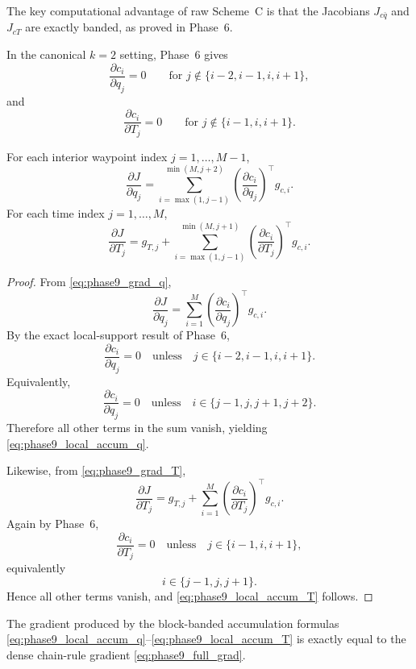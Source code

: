 The key computational advantage of raw Scheme~C is that the Jacobians \(J_{c\bar q}\) and \(J_{cT}\) are exactly banded, as proved in Phase~6.

In the canonical \(k=2\) setting, Phase~6 gives
\[
\frac{\partial c_i}{\partial q_j}=0
\qquad\text{for } j\notin\{i-2,i-1,i,i+1\},
\]
and
\[
\frac{\partial c_i}{\partial T_j}=0
\qquad\text{for } j\notin\{i-1,i,i+1\}.
\]

\begin{proposition}
\label{prop:phase9_local_accumulation}
For each interior waypoint index \(j=1,\dots,M-1\),
\begin{equation}
\label{eq:phase9_local_accum_q}
\frac{\partial J}{\partial q_j}
=
\sum_{i=\max(1,j-1)}^{\min(M,j+2)}
\left(\frac{\partial c_i}{\partial q_j}\right)^\top g_{c,i}.
\end{equation}
For each time index \(j=1,\dots,M\),
\begin{equation}
\label{eq:phase9_local_accum_T}
\frac{\partial J}{\partial T_j}
=
g_{T,j}
+
\sum_{i=\max(1,j-1)}^{\min(M,j+1)}
\left(\frac{\partial c_i}{\partial T_j}\right)^\top g_{c,i}.
\end{equation}
\end{proposition}

\begin{proof}
From \eqref{eq:phase9_grad_q},
\[
\frac{\partial J}{\partial q_j}
=
\sum_{i=1}^{M}
\left(\frac{\partial c_i}{\partial q_j}\right)^\top g_{c,i}.
\]
By the exact local-support result of Phase~6,
\[
\frac{\partial c_i}{\partial q_j}=0
\quad\text{unless}\quad
j\in\{i-2,i-1,i,i+1\}.
\]
Equivalently,
\[
\frac{\partial c_i}{\partial q_j}=0
\quad\text{unless}\quad
i\in\{j-1,j,j+1,j+2\}.
\]
Therefore all other terms in the sum vanish, yielding \eqref{eq:phase9_local_accum_q}.

Likewise, from \eqref{eq:phase9_grad_T},
\[
\frac{\partial J}{\partial T_j}
=
g_{T,j}
+
\sum_{i=1}^{M}
\left(\frac{\partial c_i}{\partial T_j}\right)^\top g_{c,i}.
\]
Again by Phase~6,
\[
\frac{\partial c_i}{\partial T_j}=0
\quad\text{unless}\quad
j\in\{i-1,i,i+1\},
\]
equivalently
\[
i\in\{j-1,j,j+1\}.
\]
Hence all other terms vanish, and \eqref{eq:phase9_local_accum_T} follows.
\end{proof}

\begin{corollary}
\label{cor:phase9_dense_banded_equiv}
The gradient produced by the block-banded accumulation formulas
\eqref{eq:phase9_local_accum_q}--\eqref{eq:phase9_local_accum_T}
is exactly equal to the dense chain-rule gradient
\eqref{eq:phase9_full_grad}.
\end{corollary}

